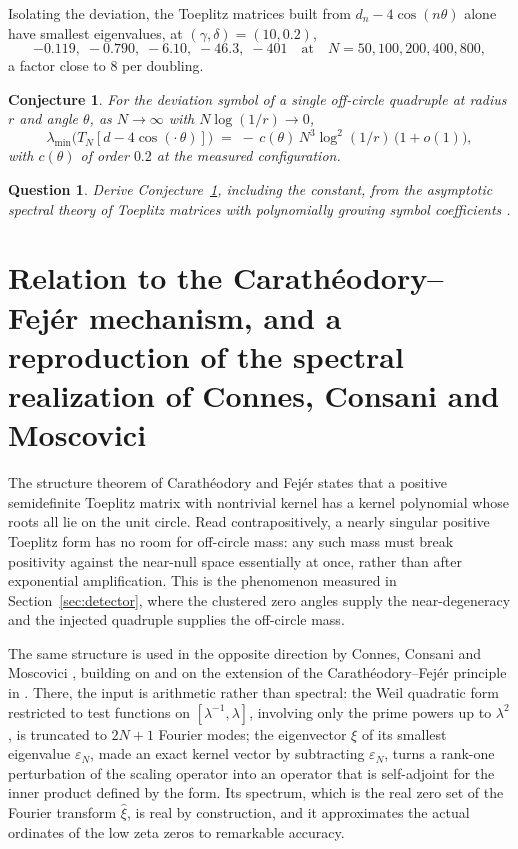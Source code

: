 \documentclass[11pt,oneside]{article}
\newtheorem{conjecture}[proposition]{Conjecture}
\newtheorem{question}[proposition]{Question}
\theoremstyle{remark}
\begin{document}
Isolating the deviation, the Toeplitz matrices built from
$d_n - 4\cos(n\theta)$ alone have smallest eigenvalues, at
$(\gamma, \delta) = (10, 0.2)$,
\[
-0.119,\; -0.790,\; -6.10,\; -46.3,\; -401
\quad\text{at}\quad N = 50, 100, 200, 400, 800,
\]
a factor close to $8$ per doubling.

\begin{samepage}
\begin{conjecture}\label{conj:law}
For the deviation symbol of a single off-circle quadruple at radius $r$ and
angle $\theta$, as $N \to \infty$ with $N\log(1/r) \to 0$,
\[
\lambda_{\min}\bigl(T_N[d - 4\cos(\cdot\,\theta)]\bigr)
\;=\; -\,c(\theta)\, N^{3} \log^{2}(1/r)\,\bigl(1 + o(1)\bigr),
\]
with $c(\theta)$ of order $0.2$ at the measured configuration.
\end{conjecture}
\end{samepage}

\begin{question}
Derive Conjecture~\ref{conj:law}, including the constant, from the asymptotic
spectral theory of Toeplitz matrices with polynomially growing symbol
coefficients \cite{BS}.
\end{question}

\section{Relation to the Carath\'eodory--Fej\'er mechanism, and a reproduction
of the spectral realization of Connes, Consani and Moscovici}\label{sec:ccm}

The structure theorem of Carath\'eodory and Fej\'er \cite{CF} states that a
positive semidefinite Toeplitz matrix with nontrivial kernel has a kernel
polynomial whose roots all lie on the unit circle. Read contrapositively, a
nearly singular positive Toeplitz form has no room for off-circle mass: any
such mass must break positivity against the near-null space essentially at
once, rather than after exponential amplification. This is the phenomenon
measured in Section~\ref{sec:detector}, where the clustered zero angles supply
the near-degeneracy and the injected quadruple supplies the off-circle mass.

The same structure is used in the opposite direction by Connes, Consani and
Moscovici \cite{CCM}, building on \cite{Connes99, CC23} and on the extension of
the Carath\'eodory--Fej\'er principle in \cite{CvS}. There, the input is
arithmetic rather than spectral: the Weil quadratic form restricted to test
functions on $[\lambda^{-1}, \lambda]$, involving only the prime powers up to
$\lambda^2$, is truncated to $2N{+}1$ Fourier modes; the eigenvector $\xi$ of
its smallest eigenvalue $\varepsilon_N$, made an exact kernel vector by
subtracting $\varepsilon_N$, turns a rank-one perturbation of the scaling
operator into an operator that is self-adjoint for the inner product defined by
the form. Its spectrum, which is the real zero set of the Fourier transform
$\widehat\xi$, is real by construction, and it approximates the actual ordinates
of the low zeta zeros to remarkable accuracy.
\end{document}

